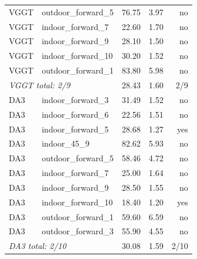 \begin{tabular}{llrrr}
VGGT & outdoor\_forward\_5 & 76.75 & 3.97 & no \\
VGGT & indoor\_forward\_7 & 22.60 & 1.70 & no \\
VGGT & indoor\_forward\_9 & 28.10 & 1.50 & no \\
VGGT & indoor\_forward\_10 & 30.20 & 1.52 & no \\
VGGT & outdoor\_forward\_1 & 83.80 & 5.98 & no \\
\multicolumn{2}{l}{\textit{VGGT total: 2/9}} & 28.43 & 1.60 & 2/9 \\
\midrule
DA3 & indoor\_forward\_3 & 31.49 & 1.52 & no \\
DA3 & indoor\_forward\_6 & 22.56 & 1.51 & no \\
DA3 & indoor\_forward\_5 & 28.68 & 1.27 & yes \\
DA3 & indoor\_45\_9 & 82.62 & 5.93 & no \\
DA3 & outdoor\_forward\_5 & 58.46 & 4.72 & no \\
DA3 & indoor\_forward\_7 & 25.00 & 1.64 & no \\
DA3 & indoor\_forward\_9 & 28.50 & 1.55 & no \\
DA3 & indoor\_forward\_10 & 18.40 & 1.20 & yes \\
DA3 & outdoor\_forward\_1 & 59.60 & 6.59 & no \\
DA3 & outdoor\_forward\_3 & 55.90 & 4.55 & no \\
\multicolumn{2}{l}{\textit{DA3 total: 2/10}} & 30.08 & 1.59 & 2/10 \\
\bottomrule
\end{tabular}
